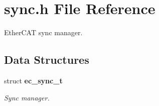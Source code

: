 \section{sync.\-h \-File \-Reference}
\label{sync_8h}


\-Ether\-C\-A\-T sync manager.  


\subsection*{\-Data \-Structures}
\begin{DoxyCompactItemize}
\item 
struct {\bf ec\-\_\-sync\-\_\-t}
\begin{DoxyCompactList}\small\item\em \-Sync manager. \end{DoxyCompactList}\end{DoxyCompactItemize}
